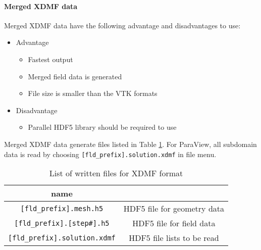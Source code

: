 \paragraph{Merged XDMF data}
Merged XDMF data have the following advantage and disadvantages to use:
%
\begin{itemize}
\item Advantage
\begin{itemize} 
\item Fastest output
\item Merged field data is generated
\item File size is smaller than the VTK formats
\end{itemize}
\item Disadvantage
\begin{itemize} 
\item Parallel HDF5 library should be required to use
\end{itemize}
\end{itemize}
%
Merged XDMF data generate files listed in Table \ref{table:XDMF}. For ParaView, all subdomain data is read by choosing \verb|[fld_prefix].solution.xdmf| in file menu.
%
\begin{table}[htp]
\caption{List of written files for XDMF format}
\begin{center} 
\begin{tabular}{|c|c|}
\hline
 name &  \\ \hline \hline
\verb|[fld_prefix].mesh.h5|  & HDF5 file for geometry data \\ \hline
\verb|[fld_prefix].[step#].h5|  &HDF5 file for field data   \\ \hline
\verb|[fld_prefix].solution.xdmf|  & HDF5 file lists to be read  \\ \hline
\end{tabular}
\end{center}
\label{table:XDMF}
\end{table}
%

